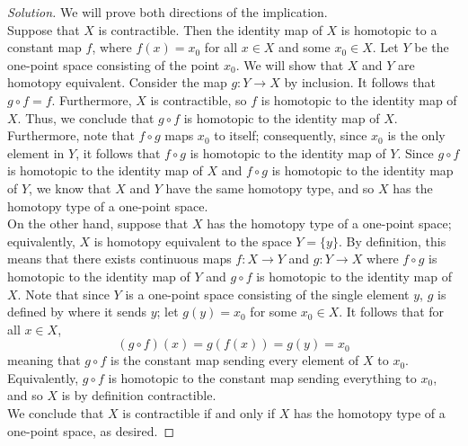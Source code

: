 \documentclass[11pt]{article}
\newenvironment{solution}
  {\renewcommand\qedsymbol{$\blacksquare$}\begin{proof}[Solution]}
  {\end{proof}}
\begin{document}
\begin{solution}
We will prove both directions of the implication. \\

Suppose that $X$ is contractible. Then the identity map of $X$ is homotopic to a constant map $f$, where $f(x) = x_0$ for all $x \in X$ and some $x_0 \in X$.
Let $Y$ be the one-point space consisting of the point $x_0$. We will show that $X$ and $Y$ are homotopy equivalent. Consider the map $g\colon Y \rightarrow X$ by inclusion. It follows that
$g \circ f = f$. Furthermore, $X$ is contractible, so $f$ is homotopic to the identity map of $X$. Thus, we conclude that $g \circ f$ is homotopic to the identity map of $X$. Furthermore, note that $f \circ g$ maps $x_0$ to itself;
consequently, since $x_0$ is the only element in $Y$, it follows that $f \circ g$ is homotopic to the identity map of $Y$. 
Since $g \circ f$ is homotopic to the identity map of $X$ and $f \circ g$ is homotopic to the identity map of $Y$, we know that $X$ and $Y$ have the same homotopy type, and so $X$ has the homotopy type of a one-point space. \\

On the other hand, suppose that $X$ has the homotopy type of a one-point space; equivalently, $X$ is homotopy equivalent to the space $Y = \{ y \}$. By definition, this means that
there exists continuous maps $f\colon X \rightarrow Y$ and $g\colon Y \rightarrow X$ where $f \circ g$ is homotopic to the identity map of $Y$ and $g \circ f$ is homotopic to the identity map of $X$. Note that since
$Y$ is a one-point space consisting of the single element $y$, $g$ is defined by where it sends $y$; let $g(y) = x_0$ for some $x_0 \in X$. It follows that for all $x \in X$,
\[
    (g \circ f)(x) = g(f(x)) = g(y) = x_0
\]
meaning that $g \circ f$ is the constant map sending every element of $X$ to $x_0$. Equivalently, $g \circ f$ is homotopic to the constant map sending everything to $x_0$, and so $X$ is by definition contractible. \\

We conclude that $X$ is contractible if and only if $X$ has the homotopy type of a one-point space, as desired.\end{solution}
\end{document}
